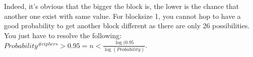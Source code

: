 \documentclass{article}
\begin{document}

Indeed, it's obvious that the bigger the block is, the lower is the chance that another one exist with same value. For blocksize 1, you cannot hop to have a good probability to get another block different as there are only 26 possibilities. You just have to resolve the following:$Probability^{\#ciphers}>0.95 = n < $.
\appendix
\newpage
\end{document}
